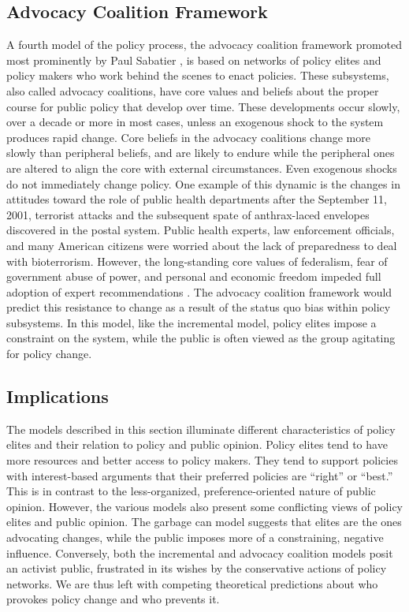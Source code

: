 \subsection*{Advocacy Coalition Framework}
A fourth model of the policy process, the advocacy coalition framework promoted most prominently by Paul Sabatier \citeyearpar{Sabatier1988}, is based on networks of policy elites and policy makers who work behind the scenes to enact policies. These subsystems, also called advocacy coalitions, have core values and beliefs about the proper course for public policy that develop over time. These developments occur slowly, over a decade or more in most cases, unless an exogenous shock to the system produces rapid change. Core beliefs in the advocacy coalitions change more slowly than peripheral beliefs, and are likely to endure while the peripheral ones are altered to align the core with external circumstances. Even exogenous shocks do not immediately change policy. One example of this dynamic is the changes in attitudes toward the role of public health departments after the September 11, 2001, terrorist attacks and the subsequent spate of anthrax-laced envelopes discovered in the postal system. Public health experts, law enforcement officials, and many American citizens were worried about the lack of preparedness to deal with bioterrorism. However, the long-standing core values of federalism, fear of government abuse of power, and personal and economic freedom impeded full adoption of expert recommendations \citep{Gostin2002}. The advocacy coalition framework would predict this resistance to change as a result of the status quo bias within policy subsystems. In this model, like the incremental model, policy elites impose a constraint on the system, while the public is often viewed as the group agitating for policy change.

\subsection*{Implications}
The models described in this section illuminate different characteristics of policy elites and their relation to policy and public opinion. Policy elites tend to have more resources and better access to policy makers. They tend to support policies with interest-based arguments that their preferred policies are ``right'' or ``best.'' This is in contrast to the less-organized, preference-oriented nature of public opinion. However, the various models also present some conflicting views of policy elites and public opinion. The garbage can model suggests that elites are the ones advocating changes, while the public imposes more of a constraining, negative influence. Conversely, both the incremental and advocacy coalition models posit an activist public, frustrated in its wishes by the conservative actions of policy networks. We are thus left with competing theoretical predictions about who provokes policy change and who prevents it.

